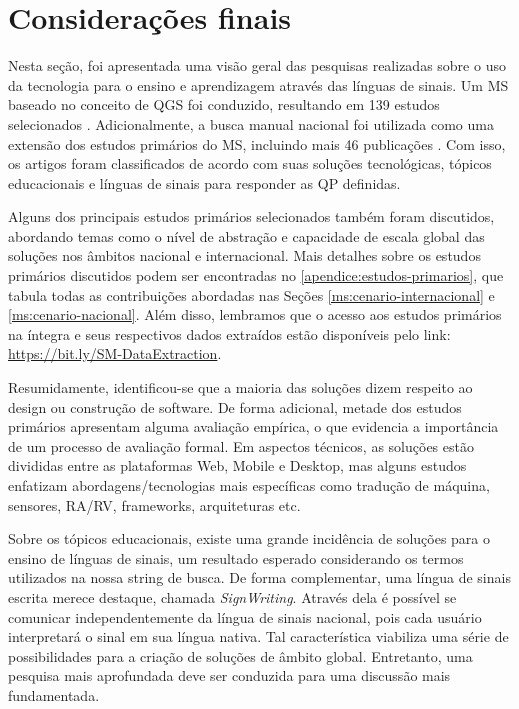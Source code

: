 
\section{Considerações finais}
\label{ms:fim}

Nesta seção, foi apresentada uma visão geral das pesquisas realizadas sobre o uso da tecnologia para o ensino e aprendizagem através das línguas de sinais. Um MS baseado no conceito de QGS foi conduzido, resultando em 139 estudos selecionados \cite{FalvoJr2020_FIE}. Adicionalmente, a busca manual nacional foi utilizada como uma extensão dos estudos primários do MS, incluindo mais 46 publicações \cite{FalvoJr2020_SBIE}. Com isso, os artigos foram classificados de acordo com suas soluções tecnológicas, tópicos educacionais e línguas de sinais para responder as QP definidas. 

Alguns dos principais estudos primários selecionados também foram discutidos, abordando temas como o nível de abstração e capacidade de escala global das soluções nos âmbitos nacional e internacional. Mais detalhes sobre os estudos primários discutidos podem ser encontradas no \autoref{apendice:estudos-primarios}, que tabula todas as contribuições abordadas nas Seções \ref{ms:cenario-internacional} e \ref{ms:cenario-nacional}. Além disso, lembramos que o acesso aos estudos primários na íntegra e seus respectivos dados extraídos estão disponíveis pelo link: \url{https://bit.ly/SM-DataExtraction}.

Resumidamente, identificou-se que a maioria das soluções dizem respeito ao design ou construção de software. De forma adicional, metade dos estudos primários apresentam alguma avaliação empírica, o que evidencia a importância de um processo de avaliação formal. Em aspectos técnicos, as soluções estão divididas entre as plataformas Web, Mobile e Desktop, mas alguns estudos enfatizam abordagens/tecnologias mais específicas como tradução de máquina, sensores, RA/RV, frameworks, arquiteturas etc.

Sobre os tópicos educacionais, existe uma grande incidência de soluções para o ensino de línguas de sinais, um resultado esperado considerando os termos utilizados na nossa string de busca. De forma complementar, uma língua de sinais escrita merece destaque, chamada \textit{SignWriting}. Através dela é possível se comunicar  independentemente da língua de sinais nacional, pois cada usuário interpretará o sinal em sua língua nativa. Tal característica viabiliza uma série de possibilidades para a criação de soluções de âmbito global. Entretanto, uma pesquisa mais aprofundada deve ser conduzida para uma discussão mais fundamentada.

